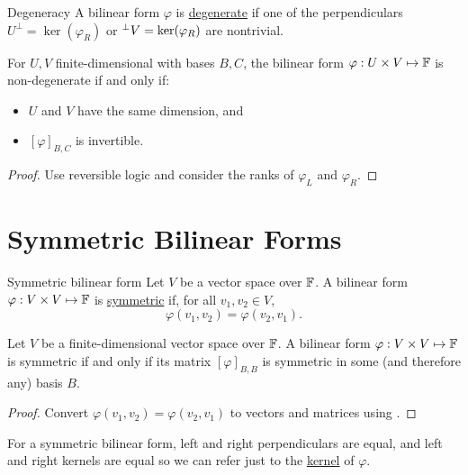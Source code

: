 \documentclass[../Main.tex]{subfiles}
\begin{document}
\begin{definition}{Degeneracy}
    A bilinear form $\varphi$ is \underline{degenerate} if one of the perpendiculars $U^\perp = \ker(\varphi_R)$ or ${}^\perp {V} = \ker(\varphi_R)$ are nontrivial.
\end{definition}
\begin{proposition}
    For $U, V$ finite-dimensional with bases $B, C$, the bilinear form $\varphi : U \times V \mapsto \mathbb{F}$ is non-degenerate if and only if:
    \begin{itemize}
        \item $U$ and $V$ have the same dimension, and
        \item $[\varphi]_{B, C}$ is invertible.
    \end{itemize}
    \label{propBFNonDegen}
\end{proposition}
\begin{proof}
    Use reversible logic and consider the ranks of $\varphi_L$ and $\varphi_R$.
\end{proof}
\section{Symmetric Bilinear Forms}
\begin{definition}{Symmetric bilinear form}
    Let $V$ be a vector space over $\mathbb{F}$. A bilinear form $\varphi : V \times V \mapsto \mathbb{F}$ is \underline{symmetric} if, for all $v_1, v_2 \in V$,
    \begin{equation*}
        \varphi(v_1, v_2) = \varphi(v_2, v_1).
    \end{equation*}
\end{definition}
\begin{proposition}
    Let $V$ be a finite-dimensional vector space over $\mathbb{F}$. A bilinear form $\varphi : V \times V \mapsto \mathbb{F}$ is symmetric if and only if its matrix $[\varphi]_{B, B}$ is symmetric in some (and therefore any) basis $B$.
    \label{propSymBMSymMatrix}
\end{proposition}
\begin{proof}
    Convert $\varphi(v_1, v_2) = \varphi(v_2, v_1)$ to vectors and matrices using .
\end{proof}
For a symmetric bilinear form, left and right perpendiculars are equal, and left and right kernels are equal so we can refer just to the \underline{kernel} of $\varphi$.
\end{document}
